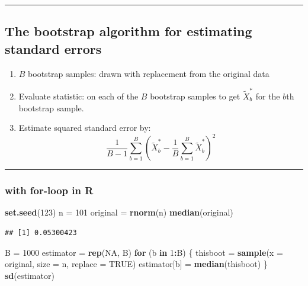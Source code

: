 \documentclass[]{article}
\newenvironment{Shaded}{\begin{snugshade}}{\end{snugshade}}
\newcommand{\ControlFlowTok}[1]{\textcolor[rgb]{0.13,0.29,0.53}{\textbf{#1}}}
\newcommand{\DataTypeTok}[1]{\textcolor[rgb]{0.13,0.29,0.53}{#1}}
\newcommand{\DecValTok}[1]{\textcolor[rgb]{0.00,0.00,0.81}{#1}}
\newcommand{\KeywordTok}[1]{\textcolor[rgb]{0.13,0.29,0.53}{\textbf{#1}}}
\newcommand{\NormalTok}[1]{#1}
\newcommand{\OperatorTok}[1]{\textcolor[rgb]{0.81,0.36,0.00}{\textbf{#1}}}
\newcommand{\OtherTok}[1]{\textcolor[rgb]{0.56,0.35,0.01}{#1}}
\newcommand{\StringTok}[1]{\textcolor[rgb]{0.31,0.60,0.02}{#1}}
\begin{document}
\begin{center}\rule{0.5\linewidth}{\linethickness}\end{center}

\hypertarget{the-bootstrap-algorithm-for-estimating-standard-errors}{%
\subsection{The bootstrap algorithm for estimating standard
errors}\label{the-bootstrap-algorithm-for-estimating-standard-errors}}

\begin{enumerate}
\def\labelenumi{\arabic{enumi}.}
\item
  \(B\) bootstrap samples: drawn with replacement from the original data
\item
  Evaluate statistic: on each of the \(B\) bootstrap samples to get
  \(\tilde{X}^*_b\) for the \(b\)th bootstrap sample.
\item
  Estimate squared standard error by:
  \[\frac{1}{B-1}\sum_{b=1}^B (\tilde{X}^*_b-\frac{1}{B}\sum_{b=1}^B \tilde{X}^*_b)^2\]
\end{enumerate}

\begin{center}\rule{0.5\linewidth}{\linethickness}\end{center}

\hypertarget{with-for-loop-in-r}{%
\subsubsection{with for-loop in R}\label{with-for-loop-in-r}}

\begin{Shaded}
\begin{Highlighting}[]
\KeywordTok{set.seed}\NormalTok{(}\DecValTok{123}\NormalTok{)}
\NormalTok{n =}\StringTok{ }\DecValTok{101}
\NormalTok{original =}\StringTok{ }\KeywordTok{rnorm}\NormalTok{(n)}
\KeywordTok{median}\NormalTok{(original)}
\end{Highlighting}
\end{Shaded}

\begin{verbatim}
## [1] 0.05300423
\end{verbatim}

\begin{Shaded}
\begin{Highlighting}[]
\NormalTok{B =}\StringTok{ }\DecValTok{1000}
\NormalTok{estimator =}\StringTok{ }\KeywordTok{rep}\NormalTok{(}\OtherTok{NA}\NormalTok{, B)}
\ControlFlowTok{for}\NormalTok{ (b }\ControlFlowTok{in} \DecValTok{1}\OperatorTok{:}\NormalTok{B) \{}
\NormalTok{    thisboot =}\StringTok{ }\KeywordTok{sample}\NormalTok{(}\DataTypeTok{x =}\NormalTok{ original, }\DataTypeTok{size =}\NormalTok{ n, }\DataTypeTok{replace =} \OtherTok{TRUE}\NormalTok{)}
\NormalTok{    estimator[b] =}\StringTok{ }\KeywordTok{median}\NormalTok{(thisboot)}
\NormalTok{\}}
\KeywordTok{sd}\NormalTok{(estimator)}
\end{Highlighting}
\end{Shaded}
\end{document}

